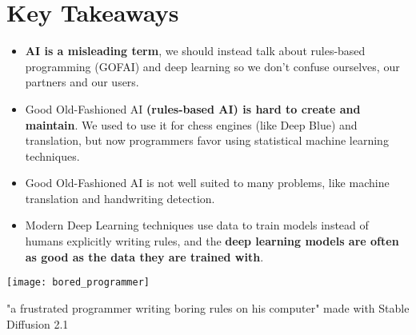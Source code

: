 \section{Key Takeaways}

\begin{itemize}
	\item \textbf{AI is a misleading term}, we should instead talk about rules-based programming (GOFAI) and deep learning so we don't confuse ourselves, our partners and our users. 
	\item Good Old-Fashioned AI \textbf{(rules-based AI) is hard to create and maintain}. We used to use it for chess engines (like Deep Blue) and translation, but now programmers favor using statistical machine learning techniques.
	\item Good Old-Fashioned AI is not well suited to many problems, like machine translation and handwriting detection.
	\item Modern Deep Learning techniques use data to train models instead of humans explicitly writing rules, and the \textbf{deep learning models are often as good as the data they are trained with}.
\end{itemize}

\begin{marginfigure}[-5.5cm]
        \texttt{[image: bored\_programmer]}
        \caption{"a frustrated programmer writing boring rules on his computer" made with Stable Diffusion 2.1}
\end{marginfigure}
